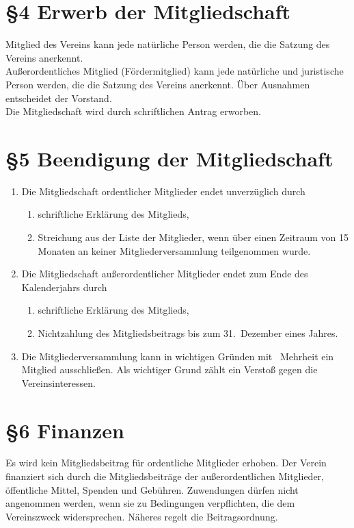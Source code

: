 \documentclass[11pt,ngerman]{article}
\begin{document}
\section*{§4 Erwerb der Mitgliedschaft}
Mitglied des Vereins kann jede natürliche Person werden, die die Satzung des Vereins anerkennt.\\

Außerordentliches Mitglied (\glqq Fördermitglied\grqq) kann jede natürliche und juristische Person werden, die die Satzung des Vereins anerkennt.
Über Ausnahmen entscheidet der Vorstand.\\
Die Mitgliedschaft wird durch schriftlichen Antrag erworben.


\section*{§5 Beendigung der Mitgliedschaft}
\begin{enumerate}
 \item Die Mitgliedschaft ordentlicher Mitglieder endet unverzüglich durch
  \begin{enumerate}
      \item schriftliche Erklärung des Mitglieds,
      \item Streichung aus der Liste der Mitglieder, wenn über einen Zeitraum von 15 Monaten an keiner Mitgliederversammlung teilgenommen wurde.
  \end{enumerate}
  \item Die Mitgliedschaft außerordentlicher Mitglieder endet zum Ende des Kalenderjahrs durch
  \begin{enumerate}
    \item schriftliche Erklärung des Mitglieds,
    \item Nichtzahlung des Mitgliedsbeitrags bis zum 31.\, Dezember eines Jahres.
  \end{enumerate}
 \item Die Mitgliederversammlung kann in wichtigen Gründen mit \ Mehrheit ein Mitglied ausschließen. Als wichtiger Grund zählt ein Verstoß gegen die Vereinsinteressen.
\end{enumerate}


\section*{§6 Finanzen}
Es wird kein Mitgliedsbeitrag für ordentliche Mitglieder erhoben. Der Verein finanziert sich durch die Mitgliedsbeiträge der außerordentlichen Mitglieder, öffentliche Mittel, Spenden und Gebühren. Zuwendungen dürfen nicht angenommen werden, wenn sie zu Bedingungen verpflichten, die dem Vereinszweck widersprechen.
Näheres regelt die Beitragsordnung.
\end{document}
